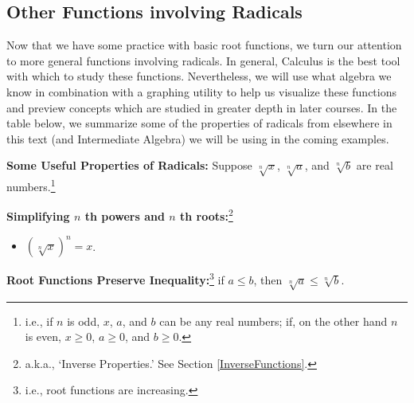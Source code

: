 \subsection{Other Functions involving Radicals}
\label{OtherFunctionsinvolvingRadicals}

Now that we have some practice with basic root functions, we turn our attention to more general functions involving radicals.  In general, Calculus is the best tool with which to study these functions.  Nevertheless,  we will use what algebra we know in combination with a graphing utility to help us visualize these functions and preview concepts which are studied in greater depth in later courses. In the table below, we summarize some of the properties of radicals from elsewhere in this text (and Intermediate Algebra) we will be using in the coming examples.  

\colorbox{ResultColor}{\bbm

\begin{thm} \label{basicradicalpropseqineq}  \textbf{Some Useful Properties of Radicals:}  Suppose $\sqrt[n]{x}$, $\sqrt[n]{a}$, and $\sqrt[n]{b}$ are real numbers.\footnote{i.e., if $n$ is odd, $x$, $a$, and $b$ can be any real numbers;  if, on the other hand $n$ is even, $x \geq 0$, $a \geq 0$, and $b \geq 0$.}


\textbf{Simplifying $n$ th powers and $n$ th roots:}\footnote{a.k.a., `Inverse Properties.'  See Section \ref{InverseFunctions}.}

\begin{itemize}

\item  $\left( \sqrt[n]{x}\right)^n = x$.


\end{itemize}

\textbf{Root Functions Preserve Inequality:}\footnote{i.e., root functions are increasing.}  if $a \leq b$, then $\sqrt[n]{a} \leq \sqrt[n]{b}$.

\end{thm}
\ebm}


